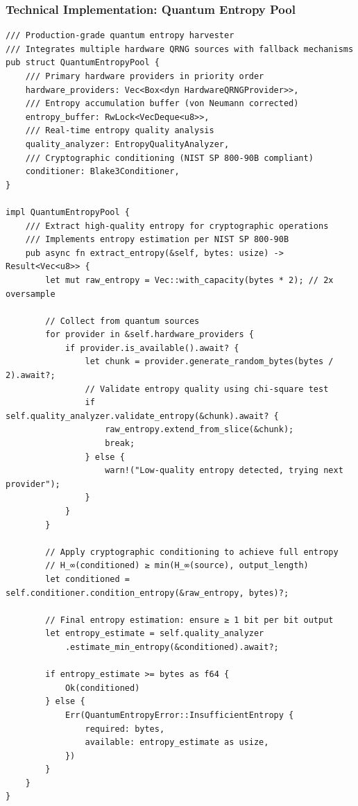 \documentclass[11pt,a4paper]{article}
\begin{document}
\subsubsection{Technical Implementation: Quantum Entropy Pool}

\begin{lstlisting}[caption=Quantum Entropy Pool Implementation]
/// Production-grade quantum entropy harvester
/// Integrates multiple hardware QRNG sources with fallback mechanisms
pub struct QuantumEntropyPool {
    /// Primary hardware providers in priority order
    hardware_providers: Vec<Box<dyn HardwareQRNGProvider>>,
    /// Entropy accumulation buffer (von Neumann corrected)
    entropy_buffer: RwLock<VecDeque<u8>>,
    /// Real-time entropy quality analysis
    quality_analyzer: EntropyQualityAnalyzer,
    /// Cryptographic conditioning (NIST SP 800-90B compliant)
    conditioner: Blake3Conditioner,
}

impl QuantumEntropyPool {
    /// Extract high-quality entropy for cryptographic operations
    /// Implements entropy estimation per NIST SP 800-90B
    pub async fn extract_entropy(&self, bytes: usize) -> Result<Vec<u8>> {
        let mut raw_entropy = Vec::with_capacity(bytes * 2); // 2x oversample
        
        // Collect from quantum sources
        for provider in &self.hardware_providers {
            if provider.is_available().await? {
                let chunk = provider.generate_random_bytes(bytes / 2).await?;
                // Validate entropy quality using chi-square test
                if self.quality_analyzer.validate_entropy(&chunk).await? {
                    raw_entropy.extend_from_slice(&chunk);
                    break;
                } else {
                    warn!("Low-quality entropy detected, trying next provider");
                }
            }
        }
        
        // Apply cryptographic conditioning to achieve full entropy
        // H_∞(conditioned) ≥ min(H_∞(source), output_length)
        let conditioned = self.conditioner.condition_entropy(&raw_entropy, bytes)?;
        
        // Final entropy estimation: ensure ≥ 1 bit per bit output
        let entropy_estimate = self.quality_analyzer
            .estimate_min_entropy(&conditioned).await?;
            
        if entropy_estimate >= bytes as f64 {
            Ok(conditioned)
        } else {
            Err(QuantumEntropyError::InsufficientEntropy {
                required: bytes,
                available: entropy_estimate as usize,
            })
        }
    }
}
\end{lstlisting}
\end{document}
